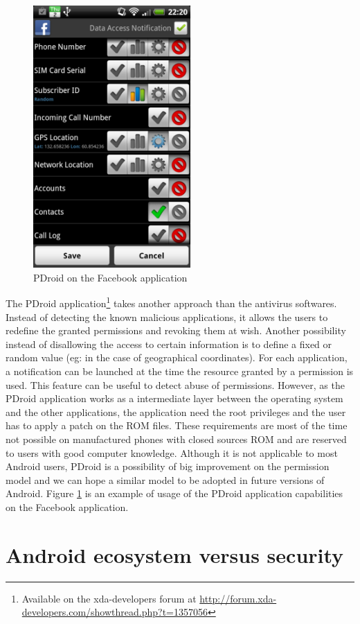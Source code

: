 \begin{figure}[h]
  \centering
  \includegraphics[width=6cm]{images/pdroid.png}
  \caption{PDroid on the Facebook application}
  \label{fig:pdroid}
\end{figure}


The PDroid application\footnote{Available on the xda-developers forum at \url{http://forum.xda-developers.com/showthread.php?t=1357056}} takes another approach than the antivirus softwares.
Instead of detecting the known malicious applications, it allows the users to redefine the granted permissions and revoking them at wish.
Another possibility instead of disallowing the access to certain information is to define a fixed or random value (eg: in the case of geographical coordinates).
For each application, a notification can be launched at the time the resource granted by a permission is used.
This feature can be useful to detect abuse of permissions.
However, as the PDroid application works as a intermediate layer between the operating system and the other applications, the application need the root privileges and the user has to apply a patch on the ROM files.
These requirements are most of the time not possible on manufactured phones with closed sources ROM and are reserved to users with good computer knowledge.
Although it is not applicable to most Android users, PDroid is a possibility of big improvement on the permission model and we can hope a similar model to be adopted in future versions of Android.
Figure \ref{fig:pdroid} is an example of usage of the PDroid application capabilities on the Facebook application.


\section{Android ecosystem versus security}
\label{sec:and-echosystem}

